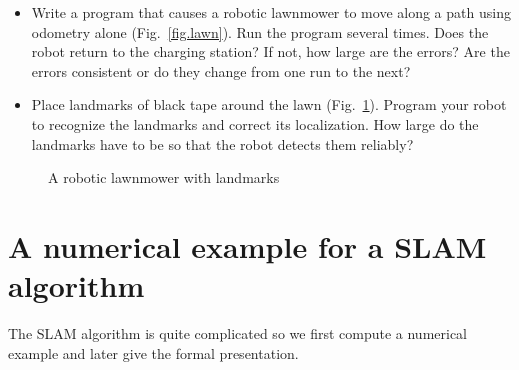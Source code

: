 \begin{framed}
\begin{itemize}
\item Write a program that causes a robotic lawnmower to move along a path using odometry alone (Fig.~\ref{fig.lawn}). Run the program several times. Does the robot return to the charging station? If not, how large are the errors? Are the errors consistent or do they change from one run to the next?
\item Place landmarks of black tape around the lawn (Fig.~\ref{fig.lawn-landmarks}). Program your robot to recognize the landmarks and correct its localization. How large do the landmarks have to be so that the robot detects them reliably?
\end{itemize}
\end{framed}

\begin{figure}
\begin{center}
\end{center}
\caption{A robotic lawnmower with landmarks}\label{fig.lawn-landmarks}
\end{figure}

\section{A numerical example for a SLAM algorithm}\label{s.slam-numerical}

The SLAM algorithm is quite complicated so we first compute a numerical example and later give the formal presentation.


